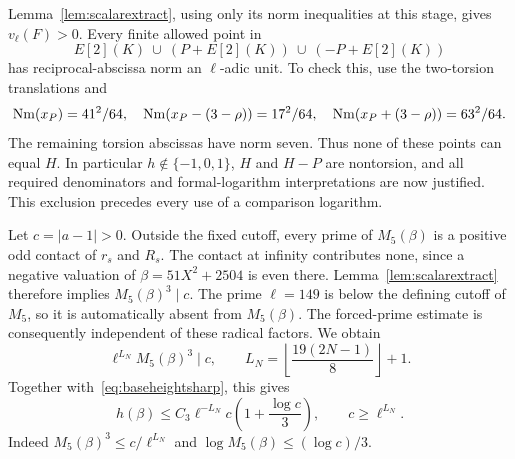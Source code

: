 \documentclass[11pt,a4paper]{article}
\begin{document}
Lemma~\ref{lem:scalarextract}, using only its norm inequalities at
this stage, gives $v_\ell(F)>0$. Every finite allowed point in
\[
                E[2](K)\ \cup\ (P+E[2](K))\ \cup\ (-P+E[2](K))
\]
has reciprocal-abscissa norm an $\ell$-adic unit. To check this,
use the two-torsion translations and
\[
 \operatorname{Nm}(x_P)=41^2/64,\quad
 \operatorname{Nm}(x_P-(3-\rho))=17^2/64,\quad
 \operatorname{Nm}(x_P+(3-\rho))=63^2/64.
\]
The remaining torsion abscissas have norm seven. Thus none of
these points can equal $H$. In particular $h\notin\{-1,0,1\}$,
$H$ and $H-P$ are nontorsion, and all required denominators and
formal-logarithm interpretations are now justified. This exclusion
precedes every use of a comparison logarithm.

Let $c=|a-1|>0$. Outside the fixed cutoff, every prime of
$M_5(\beta)$ is a positive odd contact of $r_s$ and $R_s$.
The contact at infinity contributes none, since a negative valuation
of $\beta=51X^2+2504$ is even there. Lemma~\ref{lem:scalarextract}
therefore implies $M_5(\beta)^3\mid c$. The prime $\ell=149$ is below the defining cutoff of
$M_5$, so it is automatically absent from $M_5(\beta)$.
The forced-prime estimate is consequently independent of these radical
factors. We obtain
\begin{equation}\label{eq:scalardivisibility}
 \ell^{L_N}M_5(\beta)^3\mid c,\qquad
 L_N=\left\lfloor\frac{19(2N-1)}8\right\rfloor+1.
\end{equation}
Together with~\eqref{eq:baseheightsharp}, this gives
\begin{equation}\label{eq:scalar}
 h(\beta)\le C_3\ell^{-L_N}c\left(1+\frac{\log c}{3}\right),
 \qquad c\ge\ell^{L_N}.
\end{equation}
Indeed $M_5(\beta)^3\le c/\ell^{L_N}$ and
$\log M_5(\beta)\le(\log c)/3$.
\end{document}
